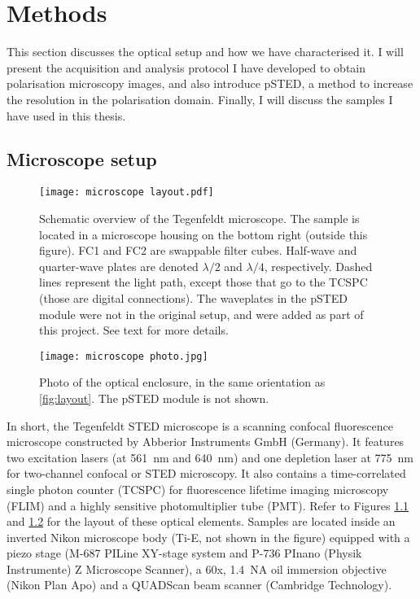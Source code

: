 \chapter{Methods}

This section discusses the optical setup and how we have characterised it. I will present the acquisition and analysis protocol I have developed to obtain polarisation microscopy images, and also introduce pSTED, a method to increase the resolution in the polarisation domain. Finally, I will discuss the samples I have used in this thesis.

\section{Microscope setup}

\begin{figure}[h!]
	\centering
	\texttt{[image: microscope layout.pdf]}
	\caption{
		Schematic overview of the Tegenfeldt microscope. The sample is located in a microscope housing on the bottom right (outside this figure). FC1 and FC2 are swappable filter cubes. Half-wave and quarter-wave plates are denoted $ \lambda/2 $ and $ \lambda/4 $, respectively. Dashed lines represent the light path, except those that go to the TCSPC (those are digital connections). The waveplates in the pSTED module were not in the original setup, and were added as part of this project. See text for more details.
	}
	\label{fig:layout}
\end{figure}

\begin{figure}
	\centering
	\texttt{[image: microscope photo.jpg]}
	\caption{
		Photo of the optical enclosure, in the same orientation as \autoref{fig:layout}. The pSTED module is not shown.
	}
	\label{fig:microscope photo}
\end{figure}

In short, the Tegenfeldt STED microscope is a scanning confocal fluorescence microscope constructed by Abberior Instruments GmbH (Germany). It features two excitation lasers (at 561~nm and 640~nm) and one depletion laser at 775~nm for two-channel confocal or STED microscopy. It also contains a time-correlated single photon counter (TCSPC) for fluorescence lifetime imaging microscopy (FLIM) and a highly sensitive photomultiplier tube (PMT). Refer to Figures \ref{fig:layout} and \ref{fig:microscope photo} for the layout of these optical elements. Samples are located inside an inverted Nikon microscope body (Ti-E, not shown in the figure) equipped with a piezo stage (M-687 PILine XY-stage system and P-736 PInano (Physik Instrumente) Z Microscope Scanner), a 60x, 1.4~NA oil immersion objective (Nikon Plan Apo) and a QUADScan beam scanner (Cambridge Technology).

